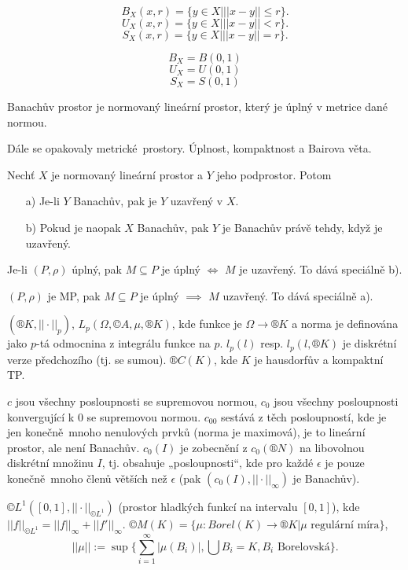 \documentclass[12pt]{article}					%
\begin{document}
\begin{definice}
	$$ B_X\left(x, r\right) = \{ y \in X | ||x - y|| ≤ r \}.  $$ 
	$$ U_X\left(x, r\right) = \{ y \in X | ||x - y|| < r \}.  $$ 
	$$ S_X\left(x, r\right) = \{ y \in X | ||x - y|| = r \}.  $$ 

	$$ B_X = B\left(0, 1\right)  $$ 
	$$ U_X = U\left(0, 1\right)  $$ 
	$$ S_X = S\left(0, 1\right)  $$ 
\end{definice}

\begin{definice}
	Banachův prostor je normovaný lineární prostor, který je úplný v metrice dané normou.
\end{definice}

Dále se opakovaly metrické prostory. Úplnost, kompaktnost a Bairova věta.

\begin{tvrzeni}
	Nechť $X$ je normovaný lineární prostor a $Y$ jeho podprostor. Potom 

	\begin{itemize}
		\item[a)] Je-li $Y$ Banachův, pak je $Y$ uzavřený v $X$.
		\item[b)] Pokud je naopak $X$ Banachův, pak $Y$ je Banachův právě tehdy, když je uzavřený.
	\end{itemize}

	\begin{dukazin}
		Je-li $\left(P,\rho\right)$ úplný, pak $M \subseteq P$ je úplný $\Leftrightarrow$ $M$ je uzavřený. To dává speciálně b).

		$\left(P, \rho\right)$ je MP, pak $M \subseteq P$ je úplný $\implies$ $M$ uzavřený. To dává speciálně a).
	\end{dukazin}
\end{tvrzeni}

\begin{priklady}
	$\left(®K, ||·||_p\right)$, $L_p(\Omega, ©A, \mu, ®K)$, kde funkce je $\Omega \rightarrow ®K$ a norma je definována jako $p$-tá odmocnina z integrálu funkce na $p$. $l_p(l)$ resp. $l_p(l, ®K)$ je diskrétní verze předchozího (tj. se sumou). $®C(K)$, kde $K$ je hausdorfův a kompaktní TP.

	$c$ jsou všechny posloupnosti se supremovou normou, $c_0$ jsou všechny posloupnosti konvergující k 0 se supremovou normou. $c_{00}$ sestává z těch posloupností, kde je jen konečně mnoho nenulových prvků (norma je maximová), je to lineární prostor, ale není Banachův. $c_0(I)$ je zobecnění z $c_0(®N)$ na libovolnou diskrétní množinu $I$, tj. obsahuje „posloupnosti“, kde pro každé $\epsilon$ je pouze konečně mnoho členů větších než $\epsilon$ (pak $(c_0(I), ||·||_∞)$ je Banachův).

	$©L^1([0, 1], || · ||_{©L^1})$ (prostor hladkých funkcí na intervalu $[0, 1]$), kde $||f||_{©L^1} = ||f||_∞ + ||f'||_∞$. $©M(K) = \{\mu : Borel(K) \rightarrow ®K | \mu \text{ regulární míra}\}$,
	$$ ||\mu|| := \sup\{\sum_{i=1}^∞|\mu(B_i)|, \bigcup B_i = K, B_i \text{ Borelovská}\}. $$
\end{priklady}
\end{document}
